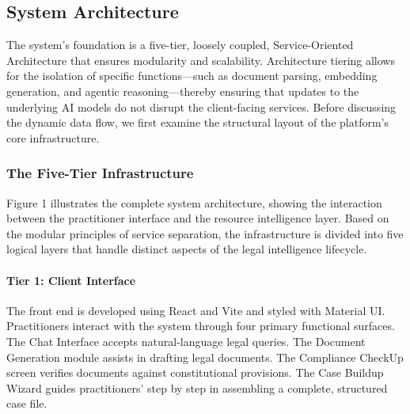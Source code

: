 \documentclass[a4paper,fleqn]{cas-dc}
\begin{document}
\subsection{System Architecture}
The system's foundation is a five-tier, loosely coupled, Service-Oriented Architecture that ensures modularity and scalability. Architecture tiering allows for the isolation of specific functions—such as document parsing, embedding generation, and agentic reasoning—thereby ensuring that updates to the underlying AI models do not disrupt the client-facing services. Before discussing the dynamic data flow, we first examine the structural layout of the platform's core infrastructure.

\subsubsection{The Five-Tier Infrastructure}
Figure 1 illustrates the complete system architecture, showing the interaction between the practitioner interface and the resource intelligence layer. Based on the modular principles of service separation, the infrastructure is divided into five logical layers that handle distinct aspects of the legal intelligence lifecycle.

\paragraph{\textbf{Tier 1: Client Interface}}
The front end is developed using React and Vite and styled with Material UI. Practitioners interact with the system through four primary functional surfaces. The Chat Interface accepts natural-language legal queries. The Document Generation module assists in drafting legal documents. The Compliance CheckUp screen verifies documents against constitutional provisions. The Case Buildup Wizard guides practitioners’ step by step in assembling a complete, structured case file.
\end{document}
